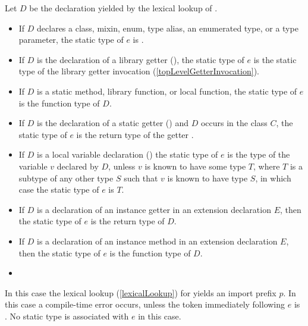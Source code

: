 \documentclass[makeidx]{article}
\begin{document}
{\LMHash{}%
Let $D$ be the declaration yielded by the lexical lookup of \id.

\begin{itemize}
\item
  If $D$ declares a class, mixin, enum, type alias, an enumerated type,
  or a type parameter,
  the static type of $e$ is .
\item
  If $D$ is the declaration of a library getter
  (),
  the static type of $e$ is the static type of the
  library getter invocation \id{}
  (\ref{topLevelGetterInvocation}).
\item
  If $D$ is a static method, library function, or local function,
  the static type of $e$ is the function type of $D$.

\item
  If $D$ is the declaration of a static getter
  ()
  and $D$ occurs in the class $C$,
  the static type of $e$ is the return type of the getter
  .
\item
  If $D$ is a local variable declaration
  ()
  the static type of $e$ is the type of the variable $v$ declared by $D$,
  unless $v$ is known to have some type $T$,
  where $T$ is a subtype of any other type $S$
  such that $v$ is known to have type $S$,
  in which case the static type of $e$ is $T$.
\item
  If $D$ is a declaration of an instance getter
  in an extension declaration $E$,
  then the static type of $e$ is the return type of $D$.
\item
  If $D$ is a declaration of an instance method
  in an extension declaration $E$,
  then the static type of $e$ is the function type of $D$.
\item
\end{itemize}
\vspace{-1ex}
\EndCase

\LMHash{}%
In this case the lexical lookup
(\ref{lexicalLookup})
for \id{} yields an import prefix $p$.
In this case a compile-time error occurs,
unless the token immediately following $e$ is .
No static type is associated with $e$ in this case.

}
\end{document}
